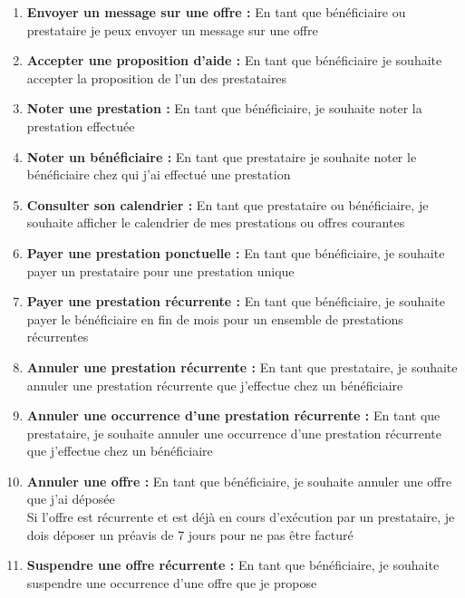 \documentclass[conference]{IEEEtran}
\begin{document}
\begin{enumerate}
	\item \textbf{Envoyer un message sur une offre :} En tant que bénéficiaire ou prestataire je peux envoyer un message sur une offre
	\item \textbf{Accepter une proposition d'aide :} En tant que bénéficiaire je souhaite accepter la proposition de l'un des prestataires
	\item \textbf{Noter une prestation :} En tant que bénéficiaire, je souhaite noter la prestation effectuée
	\item \textbf{Noter un bénéficiaire :} En tant que prestataire je souhaite noter le bénéficiaire chez qui j'ai effectué une prestation
	\item \textbf{Consulter son calendrier :} En tant que prestataire ou bénéficiaire, je souhaite afficher le calendrier de mes prestations ou offres courantes
	\item \textbf{Payer une prestation ponctuelle :} En tant que bénéficiaire, je souhaite payer un prestataire pour une prestation unique
	\item \textbf{Payer une prestation récurrente :} En tant que bénéficiaire, je souhaite payer le bénéficiaire en fin de mois pour un ensemble de prestations récurrentes
	\item \textbf{Annuler une prestation récurrente :} En tant que prestataire, je souhaite annuler une prestation récurrente que j'effectue chez un bénéficiaire
	\item \textbf{Annuler une occurrence d'une prestation récurrente :} En tant que prestataire, je souhaite annuler une occurrence d'une prestation récurrente que j'effectue chez un bénéficiaire
	\item \textbf{Annuler une offre :} En tant que bénéficiaire, je souhaite annuler une offre que j'ai déposée
	\\Si l'offre est récurrente et est déjà en cours d'exécution par un prestataire, je dois déposer un préavis de 7 jours pour ne pas être facturé
	\item \textbf{Suspendre une offre récurrente :} En tant que bénéficiaire, je souhaite suspendre une occurrence d'une offre que je propose
\end{enumerate}
\end{document}
